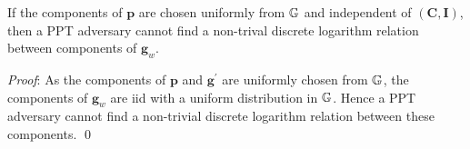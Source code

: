 \begin{lemma}\label{thmNoDLBase}
  If the components of $\textbf{p}$ are chosen uniformly from $\mathbb{G}$ and independent of $(\textbf{C}, \textbf{I})$, 
  then a \textsf{PPT} adversary cannot find a non-trival discrete logarithm relation between components of $\textbf{g}_w$.
\end{lemma}
\textit{Proof}: 
As the components of $\textbf{p}$ and $\textbf{g}^{\prime}$ are uniformly chosen from $\mathbb{G}$, the components of $\textbf{g}_w$ are iid with a uniform distribution in $\mathbb{G}$.  
Hence a PPT adversary cannot find a non-trivial discrete logarithm relation between these components.
\hfill {\small \qed}







